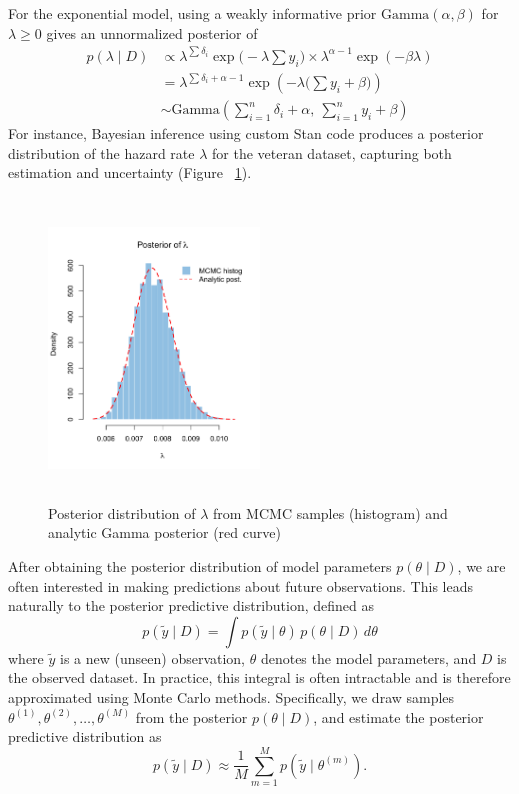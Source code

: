 For the exponential model, using a weakly informative prior $\text{Gamma}(\alpha, \beta)$ for $\lambda \ge 0$ gives an unnormalized posterior of 
\begin{align}
p(\lambda\mid D)
&\propto
\lambda^{\sum \delta_i}
\exp\Big(-\lambda \sum y_i\Big)
\times
\lambda^{\alpha - 1}
\exp(-\beta \lambda)\\
&=\lambda^{\sum \delta_i + \alpha - 1}
\exp \left( - \lambda \big(\sum y_i + \beta\big) \right) \\
&\sim
\text{Gamma}
\left(
\sum_{i=1}^{n} \delta_i + \alpha,\ \sum_{i=1}^{n} y_i + \beta
\right)
\label{eq:17}
\end{align}
For instance, Bayesian inference using custom Stan code produces a posterior distribution of the hazard rate $\lambda$ for the veteran dataset, capturing both estimation and uncertainty (Figure ~\ref{fig:exp veteran}).
\begin{figure}[H]
    \centering
    \includegraphics[height=8cm, width=0.5\textwidth]{MSc_Statistics_Research_Report_paper/images/直方图.png}
    \caption{Posterior distribution of $\lambda$ from MCMC samples (histogram) and analytic Gamma posterior (red curve)}
    \label{fig:exp veteran}
\end{figure}


After obtaining the posterior distribution of model parameters $p(\theta \mid D)$, we are often interested in making predictions about future observations. This leads naturally to the posterior predictive distribution, defined as
\begin{equation}
    p(\tilde{y} \mid D) = \int p(\tilde{y} \mid \theta)\, p(\theta \mid D)\, d\theta
    \label{eq:18}
\end{equation}
where $\tilde{y}$ is a new (unseen) observation, $\theta$ denotes the model parameters, and $D$ is the observed dataset. In practice, this integral is often intractable and is therefore approximated using Monte Carlo methods. Specifically, we draw samples $\theta^{(1)}, \theta^{(2)}, \dots, \theta^{(M)}$ from the posterior $p(\theta \mid D)$, and estimate the posterior predictive distribution as
\begin{equation}
p(\tilde{y} \mid D) \approx \frac{1}{M} \sum_{m=1}^{M} p(\tilde{y} \mid \theta^{(m)}).
\end{equation}

